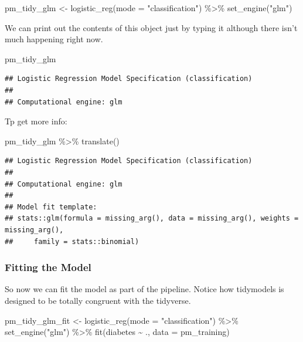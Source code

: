 \documentclass[
]{article}
\newenvironment{Shaded}{\begin{snugshade}}{\end{snugshade}}
\newcommand{\AttributeTok}[1]{\textcolor[rgb]{0.77,0.63,0.00}{#1}}
\newcommand{\FunctionTok}[1]{\textcolor[rgb]{0.00,0.00,0.00}{#1}}
\newcommand{\NormalTok}[1]{#1}
\newcommand{\OtherTok}[1]{\textcolor[rgb]{0.56,0.35,0.01}{#1}}
\newcommand{\SpecialCharTok}[1]{\textcolor[rgb]{0.00,0.00,0.00}{#1}}
\newcommand{\StringTok}[1]{\textcolor[rgb]{0.31,0.60,0.02}{#1}}
\begin{document}
\begin{Shaded}
\begin{Highlighting}[]
\NormalTok{pm\_tidy\_glm }\OtherTok{\textless{}{-}} \FunctionTok{logistic\_reg}\NormalTok{(}\AttributeTok{mode =} \StringTok{"classification"}\NormalTok{) }\SpecialCharTok{\%\textgreater{}\%}
  \FunctionTok{set\_engine}\NormalTok{(}\StringTok{"glm"}\NormalTok{) }
\end{Highlighting}
\end{Shaded}

We can print out the contents of this object just by typing it although
there isn't much happening right now.

\begin{Shaded}
\begin{Highlighting}[]
\NormalTok{pm\_tidy\_glm}
\end{Highlighting}
\end{Shaded}

\begin{verbatim}
## Logistic Regression Model Specification (classification)
## 
## Computational engine: glm
\end{verbatim}

Tp get more info:

\begin{Shaded}
\begin{Highlighting}[]
\NormalTok{pm\_tidy\_glm }\SpecialCharTok{\%\textgreater{}\%} \FunctionTok{translate}\NormalTok{()}
\end{Highlighting}
\end{Shaded}

\begin{verbatim}
## Logistic Regression Model Specification (classification)
## 
## Computational engine: glm 
## 
## Model fit template:
## stats::glm(formula = missing_arg(), data = missing_arg(), weights = missing_arg(), 
##     family = stats::binomial)
\end{verbatim}

\hypertarget{fitting-the-model}{%
\subsubsection{Fitting the Model}\label{fitting-the-model}}

So now we can fit the model as part of the pipeline. Notice how
tidymodels is designed to be totally congruent with the tidyverse.

\begin{Shaded}
\begin{Highlighting}[]
\NormalTok{pm\_tidy\_glm\_fit }\OtherTok{\textless{}{-}} \FunctionTok{logistic\_reg}\NormalTok{(}\AttributeTok{mode =} \StringTok{"classification"}\NormalTok{) }\SpecialCharTok{\%\textgreater{}\%}
  \FunctionTok{set\_engine}\NormalTok{(}\StringTok{"glm"}\NormalTok{) }\SpecialCharTok{\%\textgreater{}\%}
  \FunctionTok{fit}\NormalTok{(diabetes }\SpecialCharTok{\textasciitilde{}}\NormalTok{ ., }\AttributeTok{data =}\NormalTok{ pm\_training)}
\end{Highlighting}
\end{Shaded}
\end{document}
